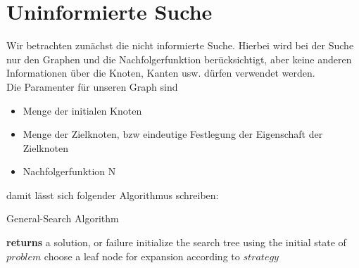 \bigskip
{}



\section{Uninformierte Suche}
Wir betrachten zunächst die nicht informierte Suche. Hierbei wird bei der Suche nur den Graphen und die Nachfolgerfunktion berücksichtigt, aber keine anderen Informationen über die Knoten, Kanten usw. dürfen verwendet werden.\\

Die Paramenter für unseren Graph sind

\begin{itemize}
  \item Menge der initialen Knoten
  \item Menge der Zielknoten, bzw eindeutige Festlegung der Eigenschaft der Zielknoten
  \item Nachfolgerfunktion N
\end{itemize}

damit lässt sich folgender Algorithmus schreiben:\\

\begin{algorithm}
\caption{General-Search Algorithm}
\begin{algorithmic}[1]
 \State \textbf{returns} a solution, or failure
\State initialize the search tree using the initial state of $problem$
\Loop \State choose a leaf node for expansion according to $strategy$
\EndLoop
\EndFunction
\end{algorithmic}
\end{algorithm}


